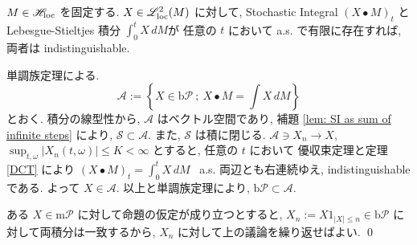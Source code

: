 \documentclass{ltjsarticle}
\begin{document}
\begin{prp} \label{relation with LS integral}
	\( M \in \mathscr{H}_{\mathrm{loc}} \) を固定する.
	\( X \in \mathscr{L}^2_{\mathrm{loc}}(M) \) に対して, Stochastic Integral \( (X \bullet M)_t \) と
	Lebesgue-Stieltjes 積分 \( \int_0^t X\,dM \)が
	任意の \( t \) において a.s. で有限に存在すれば, 両者は indistinguishable.
\end{prp}

\begin{prf}
	単調族定理による.
	\[
		\mathscr{A}	:=
		\left\{
		X \in \mathrm{b} \mathscr{P} \ ; \ 
		X \bullet M = \int X\,dM
		\right\}	
	\]
	とおく.
	積分の線型性から, \( \mathscr{A} \) はベクトル空間であり,
	補題 \ref{lem: SI as sum of infinite steps} により, \( \mathscr{S} \subset \mathscr{A} \).
	また, \( \mathscr{S} \) は積に閉じる.
	\( \mathscr{A} \ni X_n \to X \), \( \sup _{t,\omega} | X_n(t,\omega) | \le K < \infty \)
	とすると, 任意の \( t \) において 優収束定理と定理 \ref{DCT} により
	\( ( X \bullet M )_t = \int_0^t X\,dM \) \ a.s.
	両辺とも右連続ゆえ, indistinguishable である.
	よって \( X \in \mathscr{A} \).
	以上と単調族定理により, \( \mathrm{b} \mathscr{P} \subset \mathscr{A} \).
	
	ある \( X \in \mathrm{m} \mathscr{P} \) に対して命題の仮定が成り立つとすると,
	\( X_n := X1_{ |X| \le n } \in \mathrm{b} \mathscr{P} \) に対して両積分は一致するから, 
	\( X_n \) に対して上の議論を繰り返せばよい.
	\qed\end{prf}
\end{document}
